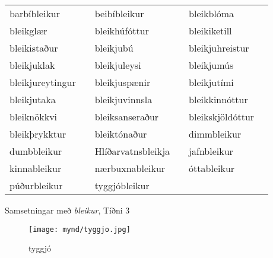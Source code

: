 \documentclass[../samsetningasafn.tex]{subfiles}
\begin{document}
\begin{wordlist}[H]
\begin{tcolorbox}

	\setlength{\extrarowheight}{3pt}
	\begin{tabular}{BlBlBl}		
		barbíbleikur		&		& 		
		beibíbleikur		&		& 		
		bleikblóma		&		\\ 		
		bleikglær		&		& 		
		bleikhúfóttur		&		& 	
		bleikiketill		&		\\ 		
		bleikistaður		&		& 	
		bleikjubú		&		& 		
		bleikjuhreistur	&		\\ 	
		bleikjuklak		&		& 		
		bleikjuleysi		&		& 		
		bleikjumús		&		\\ 		
		bleikjureytingur	&		& 		
		bleikjuspænir	&		& 		
		bleikjutími		&		\\ 	
		bleikjutaka		&		& 	
		bleikjuvinnsla	&		& 		
		bleikkinnóttur	&		\\ 		
		bleiknökkvi		&		& 		
		bleiksanseraður	&		& 		
		bleikskjöldóttur	&		\\ 	
		bleikþrykktur		&		& 	
		bleiktónaður		&		& 	
		dimmbleikur		&		\\ 		
		dumbbleikur		&		& 	
		Hlíðarvatnsbleikja &		& 		
		jafnbleikur		&		\\ 	
		kinnableikur		&		& 		
		nærbuxnableikur	&		& 	
		óttableikur		&		\\ 	
		púðurbleikur		&		& 		
		tyggjóbleikur		&		& 	
						&
	\end{tabular}

\end{tcolorbox}
	\caption{Samsetningar með \textit{bleikur}, Tíðni 3}
	\label{listi:bleikt.3}
\end{wordlist}

\begin{figure}[H]
\begin{tcolorbox}
\centering
	\texttt{[image: mynd/tyggjo.jpg]}
\end{tcolorbox}
	\caption{tyggjó}
	\label{mynd:tyggjo}
\end{figure}	
\end{document}

